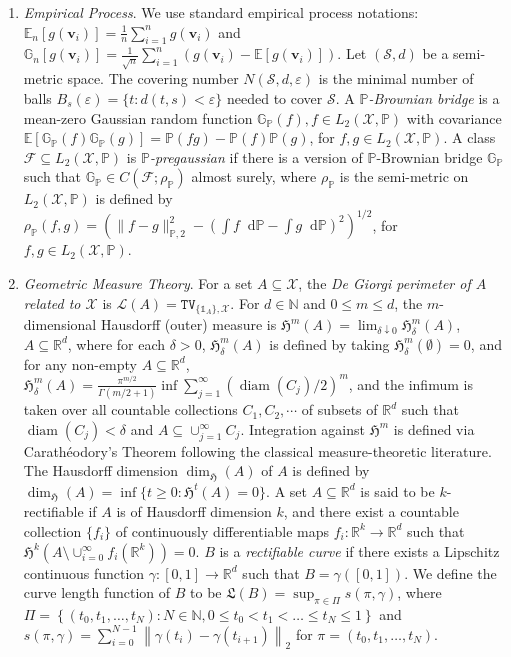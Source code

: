 \documentclass[10pt]{article}
\DeclareMathOperator{\diam}{diam}
\renewcommand{\P}{\mathbb{P}}
\newcommand{\E}{\mathbb{E}}
\newcommand{\Indicator}{\mathds{1}}
\newcommand{\En}{\mathbb{E}_n}
\newcommand{\Haus}{\mathfrak{H}}
\newcommand{\reals}{\mathbb{R}}
\newcommand{\dif}{\mathop{}\!\mathrm{d}}
\newcommand{\norm}[1]{\left\lVert#1\right\rVert}
\newcommand{\bv}{\mathbf{v}}
\newcommand{\X}{\mathcal{X}}
\newcommand{\gn}{\mathbb{G}_n}
\newcommand{\ttTV}{\mathtt{TV}}
\begin{document}
\begin{enumerate}[label=(\roman*)]
    \item \textit{Empirical Process}. We use standard empirical process notations: $\En[g(\bv_i)] = \frac{1}{n} \sum_{i = 1}^n g(\bv_i)$ and $\gn[g(\bv_i)] = \frac{1}{\sqrt{n}} \sum_{i = 1}^n (g(\bv_i) - \E[g(\bv_i)])$. Let $(\mathcal{S},d)$ be a semi-metric space. The covering number $N(\mathcal{S}, d, \varepsilon)$ is the minimal number of balls $B_s(\varepsilon) =\{t: d(t,s) < \varepsilon\}$ needed to cover $\mathcal{S}$. A \emph{$\P$-Brownian bridge} is a mean-zero Gaussian random function $\mathbb{G}_{\P}(f), f \in L_2(\X, \P)$ with covariance $\E[\mathbb{G}_{\P}(f)\mathbb{G}_{\P}(g)] = \P(fg) - \P(f)\P(g)$, for $f,g \in L_2(\X,\P)$. A class $\mathcal{F} \subseteq L_2(\X, \P)$ is \emph{$\P$-pregaussian} if there is a version of $\P$-Brownian bridge $\mathbb{G}_{\P}$ such that $\mathbb{G}_{\P} \in C(\mathcal{F}; \rho_{\P})$ almost surely, where $\rho_{\P}$ is the semi-metric on $L_2(\X,\P)$ is defined by $\rho_{\P}(f, g) = (\|f - g\|_{\P,2}^2 - (\int f \dif\P - \int g \dif\P)^2)^{1/2}$, for $f, g \in L_2(\X,\P)$.

    \item \textit{Geometric Measure Theory}. For a set $A \subseteq \X$, the \emph{De Giorgi perimeter of $A$ related to $\X$} is $\mathcal{L}(A) = \ttTV_{\{\Indicator_{A}\},\X}$. For $d \in \mathbb{N}$ and $0 \leq m \leq d$, the $m$-dimensional Hausdorff (outer) measure is $\Haus^m(A) = \lim_{\delta \downarrow 0}\Haus^m_{\delta}(A)$, $A \subseteq \reals^d$, where for each $\delta > 0$, $\Haus^m_{\delta}(A)$ is defined by taking $\Haus^m_{\delta}(\emptyset) = 0$, and for any non-empty $A \subseteq \reals^d$, $\Haus^m_{\delta}(A) = \frac{\pi^{m/2}}{\Gamma(m/2+1)} \inf \sum_{j = 1}^{\infty} (\diam(C_j)/2)^m$, and the infimum is taken over all countable collections $C_1, C_2, \cdots$ of subsets of $\reals^d$ such that $\diam(C_j) < \delta$ and $A \subseteq \cup_{j = 1}^{\infty}C_j$. Integration against $\Haus^m$ is defined via Carathéodory's Theorem following the classical measure-theoretic literature. The Hausdorff dimension $\dim_{\Haus}(A)$ of $A$ is defined by $\dim_{\Haus}(A) = \inf\{t \geq 0: \Haus^t(A) = 0\}$. A set $A \subseteq \reals^d$ is said to be $k$-rectifiable if $A$ is of Hausdorff dimension $k$, and there exist a countable collection $\{f_i\}$ of continuously differentiable maps $f_i: \reals^k \to \reals^d$ such that $\Haus^{k}(A \setminus \cup_{i = 0}^{\infty} f_i(\reals^k)) = 0$. $B$ is a \emph{rectifiable curve} if there exists a Lipschitz continuous function $\gamma:[0,1] \to \reals^d$ such that $B=\gamma([0,1])$. We define the curve length function of $B$ to be $\mathfrak{L}({B}) = \sup_{\pi \in \Pi} s(\pi, \gamma)$, where $\Pi = \left\{(t_0, t_1, \ldots, t_N): N \in \mathbb{N}, 0 \leq t_0 < t_1 < \ldots \leq t_N \leq 1\right\}$ and $s(\pi,\gamma) = \sum_{i = 0}^{N-1}\norm{\gamma(t_{i}) - \gamma(t_{i+1})}_2$ for $\pi = (t_0, t_1, \ldots, t_N)$.


\end{enumerate}
\end{document}

